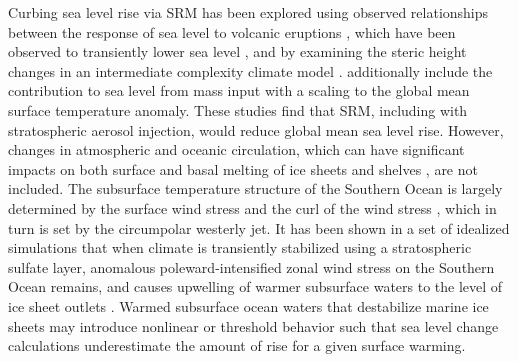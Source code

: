 \documentclass[grl]{AGUTeX}  %
\begin{document}
\begin{article}
Curbing sea level rise via SRM has been explored using observed relationships between the response of sea level to volcanic eruptions \citep{moore10}, which have been observed to transiently lower sea level \citep{church05,gleckler06}, and by examining the steric height changes in an intermediate complexity climate model \citep{irvine12}. \citet{irvine12} additionally include the contribution to sea level from mass input with a scaling to the global mean surface temperature anomaly. These studies find that SRM, including with stratospheric aerosol injection, would reduce global mean sea level rise. However, changes in atmospheric and oceanic circulation, which can have significant impacts on both surface and basal melting of ice sheets and shelves \citep{steig13,joughin11,thoma08}, are not included. The subsurface temperature structure of the Southern Ocean is largely determined by the surface wind stress and the curl of the wind stress \citep{fyfe07}, which in turn is set by the circumpolar westerly jet. It has been shown in a set of idealized simulations that when climate is transiently stabilized using a stratospheric sulfate layer, anomalous poleward-intensified zonal wind stress on the Southern Ocean remains, and causes upwelling of warmer subsurface waters to the level of ice sheet outlets \citep{mccusker12}. Warmed subsurface ocean waters that destabilize marine ice sheets may introduce nonlinear or threshold behavior \citep{notz09} such that sea level change calculations underestimate the amount of rise for a given surface warming.



\end{article}
\end{document}
